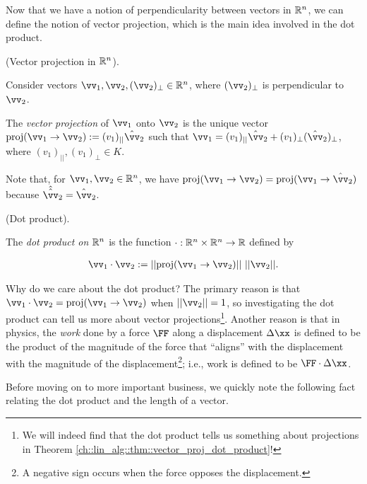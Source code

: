 Now that we have a notion of perpendicularity between vectors in $\mathbb{R}^n$, we can define the notion of vector projection, which is the main idea involved in the dot product.

\begin{defn}
\label{ch::lin_alg::defn::vector_proj}
    (Vector projection in $\mathbb{R}^n$).
    
    Consider vectors $\vv_1, \vv_2, (\vv_2)_\perp \in \R^n$, where $(\vv_2)_\perp$ is perpendicular to $\vv_2$.
    
    The \textit{vector projection} of $\vv_1$ onto $\vv_2$ is the unique vector $\proj(\vv_1 \rightarrow \vv_2) := (v_1)_{||} \hat{\vv}_2$ such that ${\vv_1 = (v_1)_{||} \hat{\vv}_2 + (v_1)_\perp (\hat{\vv}_2)_\perp}$, where $(v_1)_{||}, (v_1)_\perp \in K$.
\end{defn}

\begin{remark}
    Note that, for $\vv_1, \vv_2 \in \R^n$, we have $\proj(\vv_1 \rightarrow \vv_2) = \proj(\vv_1 \rightarrow \hat{\vv}_2)$ because $\hat{\hat{\vv}}_2 = \hat{\vv}_2$.
\end{remark}

\begin{defn}
    (Dot product). 
    
    The \textit{dot product on $\mathbb{R}^n$} is the function $\cdot:\mathbb{R}^n \times \mathbb{R}^n \rightarrow \mathbb{R}$ defined by
    
    \begin{align*}
        \vv_1 \cdot \vv_2 := || \proj(\vv_1 \rightarrow \vv_2) || \spc ||\vv_2||.
    \end{align*}
    
    Why do we care about the dot product? The primary reason is that ${\vv_1 \cdot \vv_2 = \proj(\vv_1 \rightarrow \vv_2)}$ when $||\vv_2|| = 1$, so investigating the dot product can tell us more about vector projections\footnote{We will indeed find that the dot product tells us something about projections in Theorem \ref{ch::lin_alg::thm::vector_proj_dot_product}!}. Another reason is that in physics, the \textit{work} done by a force $\FF$ along a displacement $\Delta \xx$ is defined to be the product of the magnitude of the force that ``aligns'' with the displacement with the magnitude of the displacement\footnote{A negative sign occurs when the force opposes the displacement.}; i.e., work is defined to be $\FF \cdot \Delta \xx$.
\end{defn}

Before moving on to more important business, we quickly note the following fact relating the dot product and the length of a vector.

